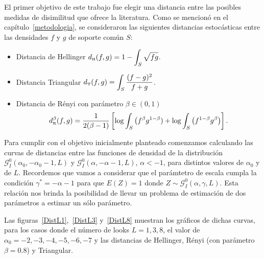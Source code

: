 El primer objetivo de este trabajo fue elegir una distancia entre las posibles medidas de disimilitud que ofrece la literatura. 
Como se mencionó en el capítulo~\ref{metodologia}, se consideraron las siguientes distancias estocásticas entre las densidades $f$ y $g$ de soporte común $S$:
\begin{itemize}
	\label{dist}
	\item Distancia de Hellinger $d_\text{\tiny H}(f,g)=1-\displaystyle{\int_{S}\sqrt{f g}}$.
	
	
	\item Distancia Triangular $d_\text{\tiny T}(f,g)=\displaystyle{\int_{S}\frac{(f-g)^2}{f+g}}$.
	
	\item Distancia de R\'enyi con parámetro $\beta\in(0,1)$
	$$
	d_\text{\tiny R}^{\beta}(f,g)=\frac{1}{2(\beta-1)}\left[\log\displaystyle{\int_{S}\big({f^{\beta}g^{1-\beta})}+\log\displaystyle{\int_{S}\big(f^{1-\beta}g^{\beta}}}\big)\right].
	$$
\end{itemize}

Para cumplir con el objetivo inicialmente planteado comenzamos calculando las curvas de distancias entre las funciones de densidad de la distribución $\mathcal G_I^0(\alpha_0, -\alpha_0-1, L)$ y $\mathcal G_I^0(\alpha,-\alpha-1,L)$, $\alpha<-1$, para distintos valores de $\alpha_0$ y de $L$. Recordemos que vamos a considerar que el parámtetro de escala cumpla la condición $\gamma^*=-\alpha-1$ para que $E(Z)=1$ donde $Z \sim \mathcal{G}_I^0(\alpha,\gamma,L)$. 
Esta relación nos brinda la posibilidad de llevar un problema de estimación de dos parámetros a estimar un sólo parámetro. 

Las figuras~\ref{DistL1},~\ref{DistL3} y~\ref{DistL8} muestran los gráficos de dichas curvas, para los casos donde el número de looks $L=1,3,8$, el valor de $\alpha_0= -2,-3,-4,-5,-6,-7$ y las distancias de Hellinger, Rényi (con parámetro $\beta=0.8$) y Triangular. 

